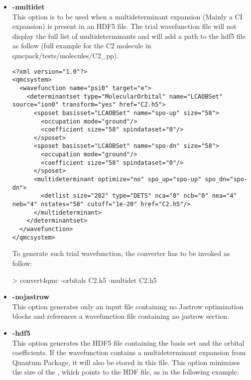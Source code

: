 \begin{itemize}
\item \textbf{-multidet}\\
This option is to be used when a multideterminant expansion (Mainly a CI expansion) is present in an HDF5 file. The trial wavefunction file will not display the full list of multideterminants and will add a path to the hdf5 file as follow (full example for the C2 molecule in qmcpack/tests/molecules/C2\_pp).

\begin{lstlisting}[style=QMCPXML]
<?xml version="1.0"?>
<qmcsystem>
  <wavefunction name="psi0" target="e">
    <determinantset type="MolecularOrbital" name="LCAOBSet" source="ion0" transform="yes" href="C2.h5">
      <sposet basisset="LCAOBSet" name="spo-up" size="58">
        <occupation mode="ground"/>
        <coefficient size="58" spindataset="0"/>
      </sposet>
      <sposet basisset="LCAOBSet" name="spo-dn" size="58">
        <occupation mode="ground"/>
        <coefficient size="58" spindataset="0"/>
      </sposet>
      <multideterminant optimize="no" spo_up="spo-up" spo_dn="spo-dn">
        <detlist size="202" type="DETS" nca="0" ncb="0" nea="4" neb="4" nstates="58" cutoff="1e-20" href="C2.h5"/>
      </multideterminant>
    </determinantset>
  </wavefunction>
</qmcsystem>
\end{lstlisting}



To generate such trial wavefunction, the converter has to be invoked as follow:

\begin{shade}
> convert4qmc -orbitals C2.h5 -multidet C2.h5 
\end{shade}


\item \textbf{-nojastrow}\\
This option generates only an input file  containing no Jastrow optimization blocks and references a wavefunction file  containing no jastrow section.

\item \textbf{-hdf5}\\
This option generates the  HDF5 file containing the basis set and the orbital coefficients. If the wavefunction contains a multideterminant expansion from Quantum Package, it will also be stored in this file. This option minimizes the size of the , which points to the HDF file, as in the following example: 


\end{itemize}
